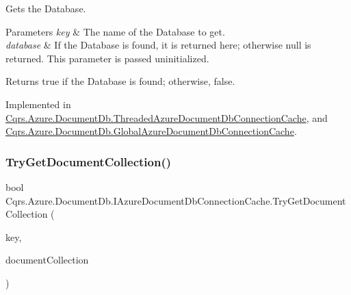Gets the Database. 


\begin{DoxyParams}{Parameters}
{\em key} & The name of the Database to get.\\
\hline
{\em database} & If the Database is found, it is returned here; otherwise null is returned. This parameter is passed uninitialized.\\
\hline
\end{DoxyParams}
\begin{DoxyReturn}{Returns}
true if the Database is found; otherwise, false.
\end{DoxyReturn}


Implemented in \hyperlink{classCqrs_1_1Azure_1_1DocumentDb_1_1ThreadedAzureDocumentDbConnectionCache_a00ea55a85c74b84cfc5f2007e3bc9be3_a00ea55a85c74b84cfc5f2007e3bc9be3}{Cqrs.\+Azure.\+Document\+Db.\+Threaded\+Azure\+Document\+Db\+Connection\+Cache}, and \hyperlink{classCqrs_1_1Azure_1_1DocumentDb_1_1GlobalAzureDocumentDbConnectionCache_afa1518eacc7e71308bfe3ef27631da45_afa1518eacc7e71308bfe3ef27631da45}{Cqrs.\+Azure.\+Document\+Db.\+Global\+Azure\+Document\+Db\+Connection\+Cache}.

\mbox{\label{interfaceCqrs_1_1Azure_1_1DocumentDb_1_1IAzureDocumentDbConnectionCache_af74bf6c8dc009e0179edc20ef3158f03_af74bf6c8dc009e0179edc20ef3158f03}} 
\subsubsection{\texorpdfstring{Try\+Get\+Document\+Collection()}{TryGetDocumentCollection()}}
{\footnotesize\ttfamily bool Cqrs.\+Azure.\+Document\+Db.\+I\+Azure\+Document\+Db\+Connection\+Cache.\+Try\+Get\+Document\+Collection (\begin{DoxyParamCaption}\item[{string}]{key,  }\item[{out Document\+Collection}]{document\+Collection }\end{DoxyParamCaption})}



